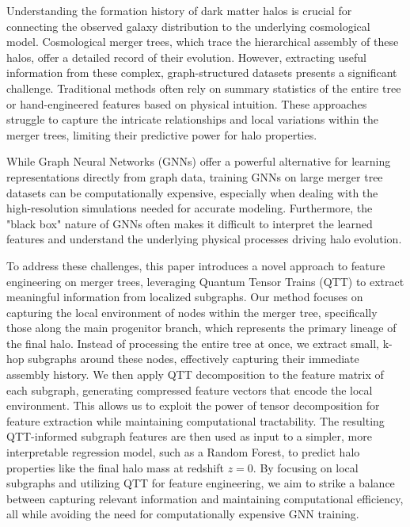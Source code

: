 \documentclass[twocolumn]{aastex631}
\begin{document}
Understanding the formation history of dark matter halos is crucial for connecting the observed galaxy distribution to the underlying cosmological model. Cosmological merger trees, which trace the hierarchical assembly of these halos, offer a detailed record of their evolution. However, extracting useful information from these complex, graph-structured datasets presents a significant challenge. Traditional methods often rely on summary statistics of the entire tree or hand-engineered features based on physical intuition. These approaches struggle to capture the intricate relationships and local variations within the merger trees, limiting their predictive power for halo properties.

While Graph Neural Networks (GNNs) offer a powerful alternative for learning representations directly from graph data, training GNNs on large merger tree datasets can be computationally expensive, especially when dealing with the high-resolution simulations needed for accurate modeling. Furthermore, the "black box" nature of GNNs often makes it difficult to interpret the learned features and understand the underlying physical processes driving halo evolution.

To address these challenges, this paper introduces a novel approach to feature engineering on merger trees, leveraging Quantum Tensor Trains (QTT) to extract meaningful information from localized subgraphs. Our method focuses on capturing the local environment of nodes within the merger tree, specifically those along the main progenitor branch, which represents the primary lineage of the final halo. Instead of processing the entire tree at once, we extract small, k-hop subgraphs around these nodes, effectively capturing their immediate assembly history. We then apply QTT decomposition to the feature matrix of each subgraph, generating compressed feature vectors that encode the local environment. This allows us to exploit the power of tensor decomposition for feature extraction while maintaining computational tractability. The resulting QTT-informed subgraph features are then used as input to a simpler, more interpretable regression model, such as a Random Forest, to predict halo properties like the final halo mass at redshift \(z=0\). By focusing on local subgraphs and utilizing QTT for feature engineering, we aim to strike a balance between capturing relevant information and maintaining computational efficiency, all while avoiding the need for computationally expensive GNN training.
\end{document}
